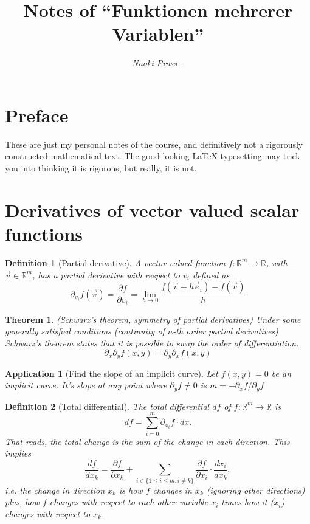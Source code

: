 \documentclass[twocolumn, margin=small]{tex/hsrzf}
\author{\textsl{Naoki Pross} -- \texttt{\theauthoremail}}
\title{Notes of ``Funktionen mehrerer Variablen''}
\date{\thesemester}
\theoremstyle{fuvarzf}
\newtheorem{theorem}{Theorem}
\newtheorem{application}{Application}
\newtheorem{definition}{Definition}
\begin{document}
\maketitle

\section{Preface}

These are just my personal notes of the \themodule{} course, and definitively
not a rigorously constructed mathematical text. The good looking \LaTeX{}
typesetting may trick you into thinking it is rigorous, but really, it is not.

\section{Derivatives of vector valued scalar functions}

\begin{definition}[Partial derivative]
  A vector valued function \(f: \mathbb{R}^m\to\mathbb{R}\), with
  \(\vec{v}\in\mathbb{R}^m\), has a partial derivative with respect to \(v_i\)
  defined as
  \[
    \partial_{v_i} f(\vec{v})
      = \frac{\partial f}{\partial v_i}
      = \lim_{h\to 0} \frac{f(\vec{v} + h\vec{e}_i) - f(\vec{v})}{h}
  \]
\end{definition}

\begin{theorem}(Schwarz's theorem, symmetry of partial derivatives)
  Under some generally satisfied conditions (continuity of \(n\)-th order
  partial derivatives) Schwarz's theorem states that it is possible to swap
  the order of differentiation.
  \[
    \partial_x \partial_y f(x,y) = \partial_y \partial_x f(x,y)
  \]
\end{theorem}

\begin{application}[Find the slope of an implicit curve]
  Let \(f(x,y) = 0\) be an implicit curve. It's slope at any point where
  \(\partial_y f \neq 0\) is \(m = - \partial_x f / \partial_y f\)
\end{application}

\begin{definition}[Total differential]
  The total differential \(df\) of \(f:\mathbb{R}^m\to\mathbb{R}\) is
  \[
    df = \sum_{i=0}^m \partial_{x_i} f\cdot dx .
  \]
  That reads, the \emph{total} change is the sum of the change in each
  direction. This implies
  \[
    \frac{df}{dx_k} = \frac{\partial f}{\partial x_k} + 
      \sum_{i \in \{1 \leq i \leq m : i \neq k\}}
      \frac{\partial f}{\partial x_i} \cdot \frac{dx_i}{dx_k} ,
  \]
  i.e. the change in direction \(x_k\) is how \(f\) changes in \(x_k\)
  (ignoring other directions) plus, how \(f\) changes with respect to each
  other variable \(x_i\) times how it (\(x_i\)) changes with respect to \(x_k\).
\end{definition}
\end{document}
